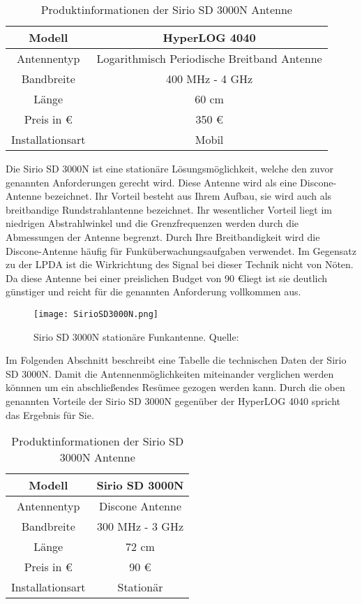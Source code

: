 \begin{table}[H]
	\centering
	\begin{tabular}{c|c}
		Modell & HyperLOG 4040\\
		\hline
		Antennentyp & Logarithmisch Periodische Breitband Antenne\\ 
		\hline 
		Bandbreite & 400 MHz - 4 GHz\\ 
		\hline 
		Länge &  60 cm\\ 
		\hline 
		Preis in \euro &  350 \euro \\ 
		\hline 
		Installationsart & Mobil\\ 
		
	\end{tabular} 
	\caption{Produktinformationen der Sirio SD 3000N Antenne}
\end{table}

Die Sirio SD 3000N ist eine stationäre Lösungsmöglichkeit, welche den zuvor genannten Anforderungen gerecht wird. Diese Antenne wird als eine Discone-Antenne bezeichnet. Ihr Vorteil besteht aus Ihrem Aufbau, sie wird auch als breitbandige Rundstrahlantenne bezeichnet. Ihr wesentlicher Vorteil liegt im niedrigen Abstrahlwinkel und die Grenzfrequenzen werden durch die Abmessungen der Antenne begrenzt. Durch Ihre Breitbandigkeit wird die Discone-Antenne häufig für Funküberwachungsaufgaben verwendet. Im Gegensatz zu der LPDA ist die Wirkrichtung des Signal bei dieser Technik nicht von Nöten. Da diese Antenne bei einer preislichen Budget von 90 \euro liegt ist sie deutlich günstiger und reicht für die genannten Anforderung vollkommen aus.


\begin{figure}[H]
	\centering
	\texttt{[image: SirioSD3000N.png]}
	\caption[Sirio SD 3000N stationäre Funkantenne]{Sirio SD 3000N stationäre Funkantenne. Quelle: \cite{Funktechnik:2018}} 
	\label{Sirio SD 3000N Antenne}
\end{figure}

Im Folgenden Abschnitt beschreibt eine Tabelle die technischen Daten der Sirio SD 3000N. Damit die Antennenmöglichkeiten miteinander verglichen werden könnnen um ein abschließendes Resümee gezogen werden kann. Durch die oben genannten Vorteile der Sirio SD 3000N gegenüber der HyperLOG 4040 spricht das Ergebnis für Sie. 

\begin{table}[H]
	\centering
	\begin{tabular}{c|c}
		Modell & Sirio SD 3000N\\
		\hline
		Antennentyp & Discone Antenne\\ 
		\hline 
		Bandbreite & 300 MHz - 3 GHz\\ 
		\hline 
		Länge &  72 cm\\ 
		\hline 
		Preis in \euro &  90 \euro \\ 
		\hline 
		Installationsart & Stationär\\ 
		
	\end{tabular} 
	\caption{Produktinformationen der Sirio SD 3000N Antenne}
\end{table}



